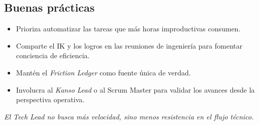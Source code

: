 \subsection*{Buenas prácticas}
\begin{itemize}
    \item Prioriza automatizar las tareas que más horas improductivas consumen.
    \item Comparte el IK y los logros en las reuniones de ingeniería para fomentar conciencia de eficiencia.
    \item Mantén el \textit{Friction Ledger} como fuente única de verdad.
    \item Involucra al \textit{Kanso Lead} o al Scrum Master para validar los avances desde la perspectiva operativa.
\end{itemize}

\textit{El Tech Lead no busca más velocidad, sino menos resistencia en el flujo técnico.}